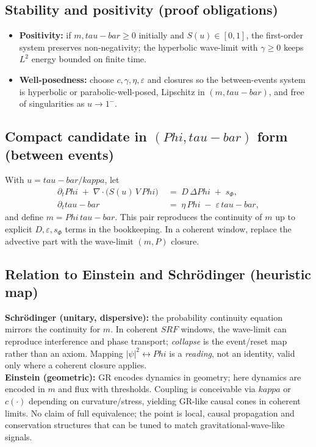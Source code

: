 \documentclass[12pt]{article}
\newcommand{\FoldDensity}{\Phi}
\newcommand{\FoldTime}{\bar{\tau}}
\newcommand{\Threshold}{\kappa}
\newcommand{\Survival}{S}
\newcommand{\SRF}{\mathcal{F}_{\mathrm{SR}}}
\def\FoldDensity{Phi}%
\def\FoldTime{tau-bar}%
\def\Threshold{kappa}%
\def\SRF{SRF}%
\def\Survival{S}%
\def\bar#1{#1}%
\def\mathcal#1{#1}%
\def\mathrm#1{#1}%
\begin{document}
\subsection{Stability and positivity (proof obligations)}
\begin{itemize}
  \item \textbf{Positivity:} if $m,\FoldTime\ge 0$ initially and $\Survival(u)\in[0,1]$, the first-order system preserves non-negativity; the hyperbolic wave-limit with $\gamma\ge 0$ keeps $L^2$ energy bounded on finite time.
  \item \textbf{Well-posedness:} choose $c,\gamma,\eta,\varepsilon$ and closures so the between-events system is hyperbolic or parabolic-well-posed, Lipschitz in $(m,\FoldTime)$, and free of singularities as $u\to 1^{-}$.
\end{itemize}

\subsection[Compact candidate in $(\FoldDensity,\FoldTime)$ form]{Compact candidate in $(\FoldDensity,\FoldTime)$ form (between events)}
With $u=\FoldTime/\Threshold$, let
\begin{align*}
\partial_t \FoldDensity \;+\; \nabla\!\cdot\!\big(\Survival(u)\,V\,\FoldDensity\big) \;&=\; D\,\Delta \FoldDensity \;+\; s_\Phi,\\
\partial_t \FoldTime \;&=\; \eta\,\FoldDensity \;-\; \varepsilon\,\FoldTime,
\end{align*}
and define $m=\FoldDensity\,\FoldTime$. This pair reproduces the continuity of $m$ up to explicit $D,\varepsilon,s_\Phi$ terms in the bookkeeping. In a coherent window, replace the advective part with the wave-limit $(m,P)$ closure.

\subsection{Relation to Einstein and Schr\"odinger (heuristic map)}
\textbf{Schr\"odinger (unitary, dispersive):} the probability continuity equation mirrors the continuity for $m$. In coherent $\SRF$ windows, the wave-limit can reproduce interference and phase transport; \emph{collapse} is the event/reset map rather than an axiom. Mapping $|\psi|^2 \leftrightarrow \FoldDensity$ is a \emph{reading}, not an identity, valid only where a coherent closure applies.\\
\textbf{Einstein (geometric):} GR encodes dynamics in geometry; here dynamics are encoded in $m$ and flux with thresholds. Coupling is conceivable via $\Threshold$ or $c(\cdot)$ depending on curvature/stress, yielding GR-like causal cones in coherent limits. No claim of full equivalence; the point is local, causal propagation and conservation structures that can be tuned to match gravitational-wave-like signals.
\end{document}
